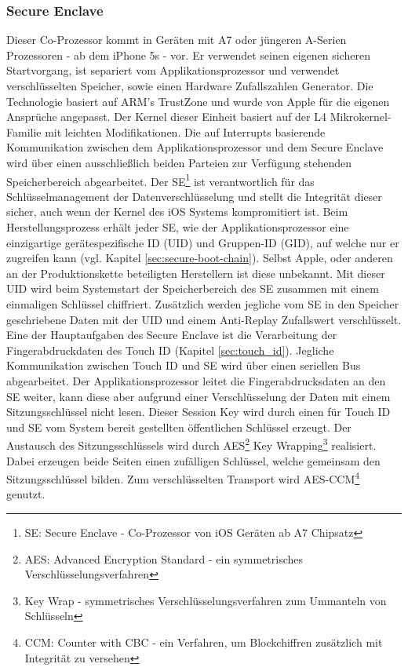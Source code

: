 	\subsubsection{Secure Enclave}\label{sec:secure_enclave}
		Dieser Co-Prozessor kommt in Geräten mit A7 oder jüngeren A-Serien
		Prozessoren - ab dem iPhone 5s - vor. Er verwendet seinen eigenen
		sicheren Startvorgang, ist separiert vom Applikationsprozessor und verwendet
		verschlüsselten Speicher, sowie einen Hardware Zufallszahlen Generator. Die
		Technologie basiert auf ARM's TrustZone\cite{TrustZone2015} und wurde von
		Apple für die eigenen Ansprüche angepasst. Der Kernel dieser Einheit basiert
		auf der L4 Mikrokernel-Familie\cite{L4MicroKernel2015} mit leichten
		Modifikationen. Die auf Interrupts basierende Kommunikation zwischen dem
		Applikationsprozessor und dem Secure Enclave wird über einen
		ausschließlich beiden Parteien zur Verfügung stehenden Speicherbereich
		abgearbeitet. Der SE\footnote{SE: Secure Enclave - Co-Prozessor von iOS
		Geräten ab A7 Chipsatz} ist verantwortlich für das Schlüsselmanagement der
		Datenverschlüsselung und stellt die Integrität dieser sicher, auch wenn der
		Kernel des iOS Systems kompromitiert ist. Beim Herstellungsprozess erhält
		jeder SE, wie der Applikationsprozessor eine einzigartige gerätespezifische
		ID (UID) und Gruppen-ID (GID), auf welche nur er zugreifen kann (vgl. Kapitel
		\ref{sec:secure-boot-chain}).
		Selbst Apple, oder anderen an der Produktionskette beteiligten Herstellern
		ist diese unbekannt. Mit dieser UID wird beim
		Systemstart der Speicherbereich des SE zusammen mit einem einmaligen
		Schlüssel chiffriert.
		Zusätzlich werden jegliche vom SE in den Speicher geschriebene Daten mit der
		UID und einem Anti-Replay Zufallswert verschlüsselt. Eine der Hauptaufgaben
		des Secure Enclave ist die Verarbeitung der Fingerabdruckdaten des Touch ID
		(Kapitel \ref{sec:touch_id}).
		Jegliche Kommunikation zwischen Touch ID und SE wird über einen seriellen Bus
		abgearbeitet. Der Applikationsprozessor leitet die Fingerabdrucksdaten an den
		SE weiter, kann diese aber aufgrund einer Verschlüsselung der Daten mit einem
		Sitzungsschlüssel nicht lesen. Dieser Session Key wird durch einen
		für Touch ID und SE vom System bereit gestellten öffentlichen
		Schlüssel erzeugt. Der Austausch des Sitzungsschlüssels wird durch
		AES\footnote{AES: Advanced Encryption Standard - ein symmetrisches
		Verschlüsselungsverfahren} Key Wrapping\footnote{Key Wrap - symmetrisches
		Verschlüsselungsverfahren zum Ummanteln von Schlüsseln} realisiert. Dabei
		erzeugen beide Seiten einen zufälligen Schlüssel, welche gemeinsam den
		Sitzungsschlüssel bilden. Zum verschlüsselten Transport wird
		AES-CCM\footnote{CCM: Counter with CBC - ein Verfahren, um Blockchiffren
		zusätzlich mit Integrität zu versehen} genutzt.
		
